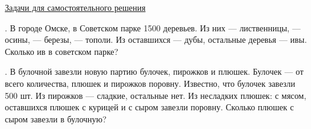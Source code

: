 \documentclass{article}
\begin{document}
\vspace{0.7cm}


\vspace{2cm}

{\fontsize{14}{10} \selectfont \underline{Задачи для самостоятельного решения} }
\vspace{0.7cm}

{\fontsize{10}{8} . В городе Омске, в Советском парке 1500 деревьев. Из них  --- лиственницы,  --- осины, 
     --- березы,  --- тополи. Из оставшихся  --- дубы, остальные деревья --- ивы. 
    Сколько ив в советском парке?
}

\vspace{0.8cm}

{\fontsize{10}{8} . В булочной завезли новую партию булочек, пирожков и плюшек. Булочек ---  от всего количества, 
    плюшек и пирожков поровну. Известно, что булочек завезли 500 шт. Из пирожков  --- сладкие, остальные нет.
    Из несладких плюшек:  с мясом, оставшихся плюшек с курицей и с сыром завезли поровну. Сколько плюшек с сыром завезли в булочную?
}
\end{document}
